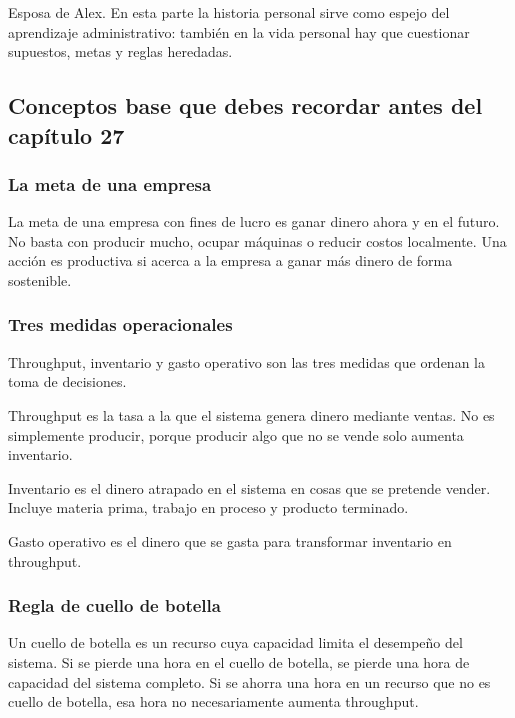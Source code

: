 \documentclass[
  11pt,
]{article}
\begin{document}
Esposa de Alex. En esta parte la historia personal sirve como espejo del
aprendizaje administrativo: también en la vida personal hay que
cuestionar supuestos, metas y reglas heredadas.

\hypertarget{conceptos-base-que-debes-recordar-antes-del-capuxedtulo-27}{%
\subsection{Conceptos base que debes recordar antes del capítulo
27}\label{conceptos-base-que-debes-recordar-antes-del-capuxedtulo-27}}

\hypertarget{la-meta-de-una-empresa}{%
\subsubsection{La meta de una empresa}\label{la-meta-de-una-empresa}}

La meta de una empresa con fines de lucro es ganar dinero ahora y en el
futuro. No basta con producir mucho, ocupar máquinas o reducir costos
localmente. Una acción es productiva si acerca a la empresa a ganar más
dinero de forma sostenible.

\hypertarget{tres-medidas-operacionales}{%
\subsubsection{Tres medidas
operacionales}\label{tres-medidas-operacionales}}

Throughput, inventario y gasto operativo son las tres medidas que
ordenan la toma de decisiones.

Throughput es la tasa a la que el sistema genera dinero mediante ventas.
No es simplemente producir, porque producir algo que no se vende solo
aumenta inventario.

Inventario es el dinero atrapado en el sistema en cosas que se pretende
vender. Incluye materia prima, trabajo en proceso y producto terminado.

Gasto operativo es el dinero que se gasta para transformar inventario en
throughput.

\hypertarget{regla-de-cuello-de-botella}{%
\subsubsection{Regla de cuello de
botella}\label{regla-de-cuello-de-botella}}

Un cuello de botella es un recurso cuya capacidad limita el desempeño
del sistema. Si se pierde una hora en el cuello de botella, se pierde
una hora de capacidad del sistema completo. Si se ahorra una hora en un
recurso que no es cuello de botella, esa hora no necesariamente aumenta
throughput.
\end{document}
